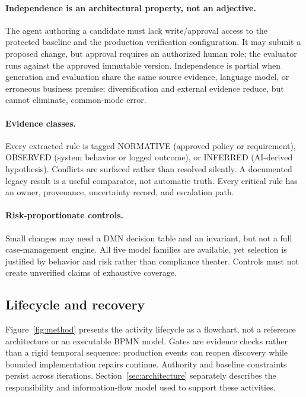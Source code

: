 \documentclass[11pt,a4paper]{article}
\begin{document}
\paragraph{Independence is an architectural property, not an adjective.}
The agent authoring a candidate must lack write/approval access to the protected baseline and the production verification configuration. It may submit a proposed change, but approval requires an authorized human role; the evaluator runs against the approved immutable version. Independence is partial when generation and evaluation share the same source evidence, language model, or erroneous business premise; diversification and external evidence reduce, but cannot eliminate, common-mode error.

\paragraph{Evidence classes.}
Every extracted rule is tagged \textsf{NORMATIVE} (approved policy or requirement), \textsf{OBSERVED} (system behavior or logged outcome), or \textsf{INFERRED} (AI-derived hypothesis). Conflicts are surfaced rather than resolved silently. A documented legacy result is a useful comparator, not automatic truth. Every critical rule has an owner, provenance, uncertainty record, and escalation path.

\paragraph{Risk-proportionate controls.}
Small changes may need a DMN decision table and an invariant, but not a full case-management engine. All five model families are available, yet selection is justified by behavior and risk rather than compliance theater. Controls must not create unverified claims of exhaustive coverage.

\subsection{Lifecycle and recovery}
Figure~\ref{fig:method} presents the activity lifecycle as a flowchart, not a reference architecture or an executable BPMN model. Gates are evidence checks rather than a rigid temporal sequence: production events can reopen discovery while bounded implementation repairs continue. Authority and baseline constraints persist across iterations. Section~\ref{sec:architecture} separately describes the responsibility and information-flow model used to support these activities.
\end{document}
